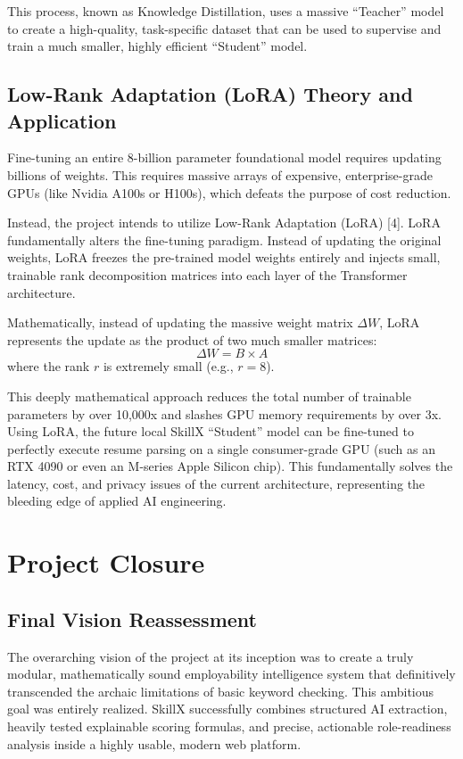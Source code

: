\documentclass[12pt,a4paper]{report}
\begin{document}
This process, known as Knowledge Distillation, uses a massive ``Teacher'' model to create a high-quality, task-specific dataset that can be used to supervise and train a much smaller, highly efficient ``Student'' model.

\section{Low-Rank Adaptation (LoRA) Theory and Application}

Fine-tuning an entire 8-billion parameter foundational model requires updating billions of weights. This requires massive arrays of expensive, enterprise-grade GPUs (like Nvidia A100s or H100s), which defeats the purpose of cost reduction. 

Instead, the project intends to utilize Low-Rank Adaptation (LoRA) [4]. LoRA fundamentally alters the fine-tuning paradigm. Instead of updating the original weights, LoRA freezes the pre-trained model weights entirely and injects small, trainable rank decomposition matrices into each layer of the Transformer architecture.

Mathematically, instead of updating the massive weight matrix $\Delta W$, LoRA represents the update as the product of two much smaller matrices: 
\begin{equation}
\Delta W = B \times A
\end{equation}
where the rank $r$ is extremely small (e.g., $r=8$). 

This deeply mathematical approach reduces the total number of trainable parameters by over 10,000x and slashes GPU memory requirements by over 3x. Using LoRA, the future local SkillX ``Student'' model can be fine-tuned to perfectly execute resume parsing on a single consumer-grade GPU (such as an RTX 4090 or even an M-series Apple Silicon chip). This fundamentally solves the latency, cost, and privacy issues of the current architecture, representing the bleeding edge of applied AI engineering.

\chapter{Project Closure}

\section{Final Vision Reassessment}

The overarching vision of the project at its inception was to create a truly modular, mathematically sound employability intelligence system that definitively transcended the archaic limitations of basic keyword checking. This ambitious goal was entirely realized. SkillX successfully combines structured AI extraction, heavily tested explainable scoring formulas, and precise, actionable role-readiness analysis inside a highly usable, modern web platform.
\end{document}
